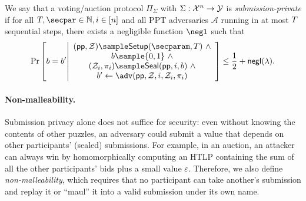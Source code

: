 \begin{definition}\label{def:submission_privacy}
We say that a voting/auction protocol $\Pi_\Sigma$ with $\Sigma: \mathcal{X}^n \to \mathcal{Y}$ is \emph{submission-private} if for all $\timeT,\secpar \in \mathbb{N}, i \in [n]$ and all PPT adversaries $\mathcal{A}$ running in at most $T$ sequential steps, there exists a negligible function $\negl$ such that 
\begin{equation*}
    \Pr\left[
        b=b'
        \middle|
        \begin{array}{c}
            (\pparam, \Z) \sample \Setup(\secparam, \timeT)~\land\\       
            b\sample\{0,1\}~\land\\
            (\Z_i, \pi_i) \sample \Seal(\pparam, i, b)~\land\\
            b'\gets\adv(\pparam,\Z,i, \Z_i, \pi_i)\\
        \end{array}
    \right]
    \leq \frac{1}{2} + \mathsf{negl}(\lambda).
\end{equation*}
\end{definition}

\paragraph{Non-malleability.} 
Submission privacy alone does not suffice for security: even without knowing the contents of other puzzles, an adversary could submit a value that depends on other participants' (sealed) submissions. For example, in an auction, an attacker can always win by homomorphically computing an HTLP containing the sum of all the other participants' bids plus a small value $\varepsilon$. Therefore, we also define \emph{non-malleability}, which requires that no participant can take another's submission and replay it or ``maul'' it into a valid submission under its own name.

